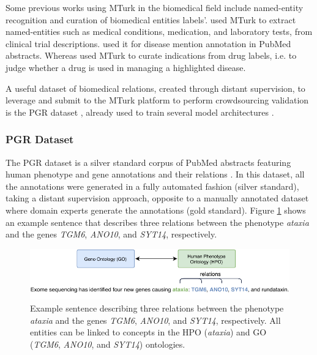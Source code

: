 Some previous works using MTurk in the biomedical field include named-entity recognition and curation of biomedical entities labels’. \cite{yetisgen2010preliminary} used MTurk to extract named-entities such as medical conditions, medication, and laboratory tests, from clinical trial descriptions. \cite{good2014microtask} used it for disease mention annotation in PubMed abstracts. Whereas \cite{khare2015scaling} used MTurk to curate indications from drug labels, i.e. to judge whether a drug is used in managing a highlighted disease. 

A useful dataset of biomedical relations, created through distant supervision, to leverage and submit to the MTurk platform to perform crowdsourcing validation is the PGR dataset \citep{sousa2019silver}, already used to train several model architectures \citep{song2019leveraging,sousa2020biont,sung2020biomedical,jin2020relation,lee2020biobert}. 

\subsubsection{PGR Dataset}

The PGR dataset is a silver standard corpus of PubMed abstracts featuring human phenotype and gene annotations and their relations \citep{sousa2019silver}. In this dataset, all the annotations were generated in a fully automated fashion (silver standard), taking a distant supervision approach, opposite to a manually annotated dataset where domain experts generate the annotations (gold standard). Figure \ref{fig3} shows an example sentence that describes three relations between the phenotype \textit{ataxia} and the genes \textit{TGM6}, \textit{ANO10}, and \textit{SYT14}, respectively.

\begin{figure}[ht]
\centering
\includegraphics[width=15cm]{images/figure_example_pgr.pdf}
\caption[Example Sentence Presenting Human Phenotype-Gene Relations]{Example sentence describing three relations between the phenotype \textit{ataxia} and the genes \textit{TGM6}, \textit{ANO10}, and \textit{SYT14}, respectively. All entities can be linked to concepts in the HPO \citep{kohler2017human} (\textit{ataxia}) and GO \citep{ashburner2000gene} (\textit{TGM6}, \textit{ANO10}, and \textit{SYT14}) ontologies.} \label{fig3}
\end{figure}

